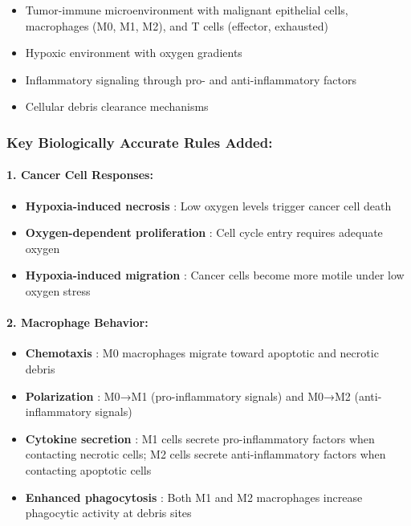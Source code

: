 \begin{itemize}
\tightlist
\item
  Tumor-immune microenvironment with malignant epithelial cells,
  macrophages (M0, M1, M2), and T cells (effector, exhausted)
\item
  Hypoxic environment with oxygen gradients
\item
  Inflammatory signaling through pro- and anti-inflammatory factors
\item
  Cellular debris clearance mechanisms
\end{itemize}

\hypertarget{key-biologically-accurate-rules-added}{%
\subsubsection{\texorpdfstring{\textbf{Key Biologically Accurate Rules
Added:}}{Key Biologically Accurate Rules Added:}}\label{key-biologically-accurate-rules-added}}

\hypertarget{cancer-cell-responses}{%
\paragraph{\texorpdfstring{\textbf{1. Cancer Cell
Responses:}}{1. Cancer Cell Responses:}}\label{cancer-cell-responses}}

\begin{itemize}
\tightlist
\item
  \textbf{Hypoxia-induced necrosis} : Low oxygen levels trigger cancer
  cell death
\item
  \textbf{Oxygen-dependent proliferation} : Cell cycle entry requires
  adequate oxygen
\item
  \textbf{Hypoxia-induced migration} : Cancer cells become more motile
  under low oxygen stress
\end{itemize}

\hypertarget{macrophage-behavior}{%
\paragraph{\texorpdfstring{\textbf{2. Macrophage
Behavior:}}{2. Macrophage Behavior:}}\label{macrophage-behavior}}

\begin{itemize}
\tightlist
\item
  \textbf{Chemotaxis} : M0 macrophages migrate toward apoptotic and
  necrotic debris
\item
  \textbf{Polarization} : M0→M1 (pro-inflammatory signals) and M0→M2
  (anti-inflammatory signals)
\item
  \textbf{Cytokine secretion} : M1 cells secrete pro-inflammatory
  factors when contacting necrotic cells; M2 cells secrete
  anti-inflammatory factors when contacting apoptotic cells
\item
  \textbf{Enhanced phagocytosis} : Both M1 and M2 macrophages increase
  phagocytic activity at debris sites
\end{itemize}

